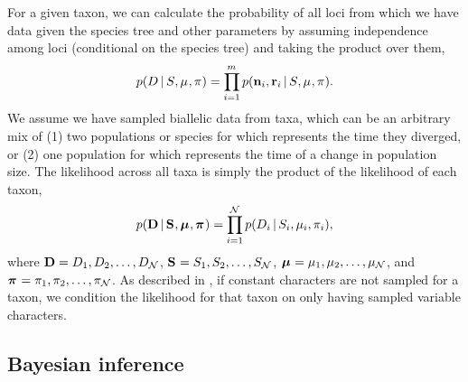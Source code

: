 \begin{linenomath}
For a given taxon, we can calculate the probability of all \nloci{} loci
from which we have data given the species tree and other parameters by
assuming independence among loci (conditional on the species tree) and
taking the product over them,
\begin{equation}
    \pr(\comparisondata \given \sptree, \murate, \gfreq)
    =
    \prod_{i=1}^{\nloci}
    \pr(\leafallelecounts[i], \leafredallelecounts[i] \given \sptree, \murate, \gfreq).
    \label{eq:comparisonlikelihood}
\end{equation}
We assume we have sampled biallelic data from \ncomparisons{} taxa, which can
be an arbitrary mix of
(1) two populations or species for which \comparisonetime represents
the time they diverged, or
(2) one population for which \comparisonetime represents the time
of a change in population size.
The likelihood across all \ncomparisons{} taxa is simply the product of the
likelihood of each taxon,
\begin{equation}
    \pr(
    \alldata
    \given
    \sptrees,
    \murates,
    \gfreqs)
    =
    \prod_{i=1}^{\ncomparisons}
    \pr(\comparisondata[i] \given \sptree[i], \murate[i], \gfreq[i]),
    \label{eq:collectionlikelihood}
\end{equation}
where
$\alldata = \comparisondata[1], \comparisondata[2], \ldots, \comparisondata[\ncomparisons]$,
$\sptrees = \sptree[1], \sptree[2], \ldots, \sptree[\ncomparisons]$,
$\murates = \murate[1], \murate[2], \ldots, \murate[\ncomparisons]$,
and
$\gfreqs = \gfreq[1], \gfreq[2], \ldots, \gfreq[\ncomparisons]$.
As described in \citet{Oaks2018ecoevolity},
if constant characters are not sampled for a taxon, we condition the likelihood
for that taxon on only having sampled variable characters.
\end{linenomath}


\subsection{Bayesian inference}

